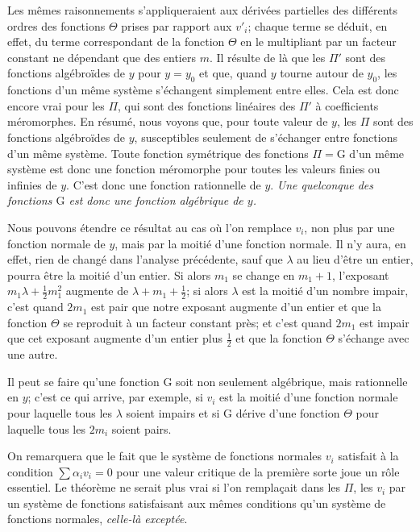 \documentclass{article}
\begin{document}
Les mêmes raisonnements s'appliqueraient aux dérivées partielles des différents ordres des fonctions $\Theta$ prises par rapport aux $v'_{i}$; chaque terme se déduit, en effet, du terme correspondant de la fonction $\Theta$ en le multipliant par un
facteur constant ne dépendant que des entiers $m$. Il résulte de là que les $\Pi'$ sont des fonctions algébroïdes de $y$ pour $y = y_{0}$ et que, quand $y$ tourne autour de $y_{0}$, les fonctions d'un même système s'échangent simplement entre elles. Cela est donc encore vrai pour les $\Pi$, qui sont des fonctions linéaires des $\Pi'$ à coefficients méromorphes. En résumé, nous voyons que, pour toute valeur de $y$, les $\Pi$ sont des fonctions algébroïdes de $y$, susceptibles seulement de s'échanger entre fonctions d'un même système. Toute fonction symétrique des fonctions $\Pi = \mathrm{G}$ d'un même système est donc une fonction méromorphe pour toutes les valeurs finies ou infinies de $y$. C'est donc une fonction rationnelle de $y$. \emph{Une quelconque des fonctions $\mathrm{G}$ est donc une fonction algébrique de $y$.}

Nous pouvons étendre ce résultat au cas où l'on remplace $v_{i}$, non plus par une fonction normale de $y$, mais par la moitié d'une fonction normale. Il n'y aura, en effet, rien de changé dans l'analyse précédente, sauf que $\lambda$ au lieu d'être un entier, pourra être la moitié d'un entier. Si alors $m_{1}$ se change en $m_{1} + 1$, l'exposant $m_{1}\lambda + \frac{1}{2}m_{1}^{2}$ augmente de $\lambda + m_{1} + \frac{1}{2}$; si alors $\lambda$ est la moitié d'un nombre impair, c'est quand $2m_{1}$ est pair que notre exposant augmente d'un entier et que la fonction $\Theta$ se reproduit à un facteur constant près; et c'est quand $2m_{1}$ est impair que cet exposant augmente d'un entier plus $\frac{1}{2}$ et que la fonction $\Theta$ s'échange avec une autre.

Il peut se faire qu'une fonction $\mathrm{G}$ soit non seulement algébrique, mais rationnelle en $y$; c'est ce qui arrive, par exemple, si $v_{i}$ est la moitié d'une fonction normale pour laquelle tous les $\lambda$ soient impairs et si $\mathrm{G}$ dérive d'une fonction $\Theta$ pour laquelle tous les $2m_{i}$ soient pairs.

On remarquera que le fait que le système de fonctions normales $v_{i}$ satisfait à la condition $\displaystyle\sum \alpha_{i} v_{i} = 0$ pour une valeur critique de la première sorte joue un rôle essentiel. Le théorème ne serait plus vrai si l'on remplaçait dans les $\Pi$, les $v_{i}$ par un système de fonctions satisfaisant aux mêmes conditions qu'un système de fonctions normales, \emph{celle-là exceptée}.
\end{document}
